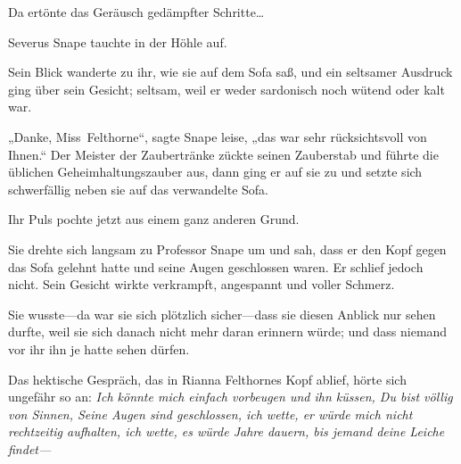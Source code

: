 Da ertönte das Geräusch gedämpfter Schritte…

Severus Snape tauchte in der Höhle auf.

Sein Blick wanderte zu ihr, wie sie auf dem Sofa saß, und ein seltsamer Ausdruck ging über sein Gesicht; seltsam, weil er weder sardonisch noch wütend oder kalt war.

„Danke, Miss~Felthorne“, sagte Snape leise, „das war sehr rücksichtsvoll von Ihnen.“ Der Meister der Zaubertränke zückte seinen Zauberstab und führte die üblichen Geheimhaltungszauber aus, dann ging er auf sie zu und setzte sich schwerfällig neben sie auf das verwandelte Sofa.

Ihr Puls pochte jetzt aus einem ganz anderen Grund.

Sie drehte sich langsam zu Professor Snape um und sah, dass er den Kopf gegen das Sofa gelehnt hatte und seine Augen geschlossen waren. Er schlief jedoch nicht. Sein Gesicht wirkte verkrampft, angespannt und voller Schmerz.

Sie wusste—da war sie sich plötzlich sicher—dass sie diesen Anblick nur sehen durfte, weil sie sich danach nicht mehr daran erinnern würde; und dass niemand vor ihr ihn je hatte sehen dürfen.

Das hektische Gespräch, das in Rianna Felthornes Kopf ablief, hörte sich ungefähr so an: \emph{Ich könnte mich einfach vorbeugen und ihn küssen, Du bist völlig von Sinnen, Seine Augen sind geschlossen, ich wette, er würde mich nicht rechtzeitig aufhalten, ich wette, es würde Jahre dauern, bis jemand deine Leiche findet—}

